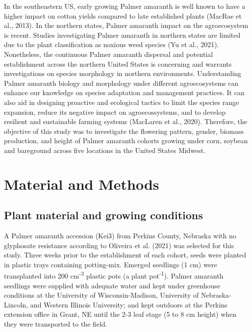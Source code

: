 \documentclass[utf8]{frontiersSCNS}
\begin{document}
In the southeastern US, early growing Palmer amaranth is well known to
have a higher impact on cotton yields compared to late established
plants (MacRae et al., 2013). In the northern states, Palmer amaranth
impact on the agroecosystem is recent. Studies investigating Palmer
amaranth in northern states are limited due to the plant classification
as noxious weed species (Yu et al., 2021). Nonetheless, the continuous
Palmer amaranth dispersal and potential establishment across the
northern United States is concerning and warrants investigations on
species morphology in northern environments. Understanding Palmer
amaranth biology and morphology under different agroecosystems can
enhance our knowledge on species adaptation and management practices. It
can also aid in designing proactive and ecological tactics to limit the
species range expansion, reduce its negative impact on agroecossystems,
and to develop resilient and sustainable farming systems (MacLaren et
al., 2020). Therefore, the objective of this study was to investigate
the flowering pattern, gender, biomass production, and height of Palmer
amaranth cohorts growing under corn, soybean and bareground across five
locations in the United States Midwest.

\hypertarget{material-and-methods}{%
\section*{Material and Methods}\label{material-and-methods}}

\hypertarget{plant-material-and-growing-conditions}{%
\subsection*{Plant material and growing
conditions}\label{plant-material-and-growing-conditions}}

A Palmer amaranth accession (Kei3) from Perkins County, Nebraska with no
glyphosate resistance according to Oliveira et al. (2021) was selected
for this study. Three weeks prior to the establishment of each cohort,
seeds were planted in plastic trays containing potting-mix. Emerged
seedlings (1 cm) were transplanted into 200 cm\textsuperscript{-3}
plastic pots (a plant pot\textsuperscript{-1}). Palmer amaranth
seedlings were supplied with adequate water and kept under greenhouse
conditions at the University of Wisconsin-Madison, University of
Nebraska-Lincoln, and Western Illinois University; and kept outdoors at
the Perkins extension office in Grant, NE until the 2-3 leaf stage (5 to
8 cm height) when they were transported to the field.
\end{document}
